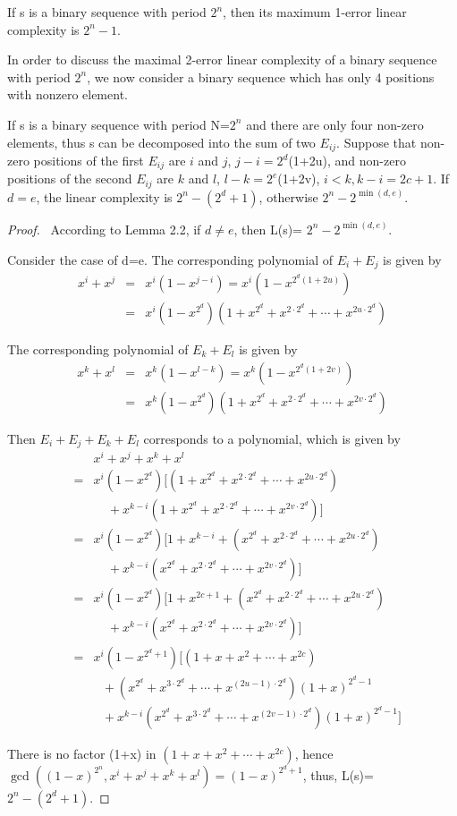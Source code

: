 \documentclass[10pt,conference,twocolumn]{IEEEtran}
\begin{document}
  If s is a binary sequence with period
$2^n$, then its maximum 1-error linear complexity is $2^n-1$.

In order to discuss the maximal 2-error linear complexity of a
binary sequence with period $ 2^n$, we now consider a binary
sequence which has only 4 positions with nonzero element.


 If s is a binary sequence with period
N=$2^n$ and there are only four non-zero elements, thus s can be
decomposed into the sum of two $E_{ij}$. Suppose that non-zero
positions of the first $E_{ij}$ are $i$ and $j$, $j-i=2^d$(1+2u),
and non-zero positions of the second $E_{ij}$ are $k$ and $l$,
$l-k=2^e$(1+2v), $i<k, k-i=2c+1$. If $d=e$, the linear complexity is
$2^n-(2^d+1)$, otherwise $2^n-2^{\min(d,e)}$.

\begin{proof}\
According to Lemma 2.2, if $d\ne e$, then L(s)= $2^n-2^{\min(d,e)}$.

Consider the case of d=e. The corresponding polynomial of $E_i+E_j$
is given by
\begin{eqnarray*}
x^i+x^j&=&x^i(1-x^{j-i})=x^i(1-x^{2^d(1+2u)})\\
&=&x^i(1-x^{2^d})(1+x^{2^d}+x^{2\cdot2^d}+\cdots +x^{2u\cdot2^d})
 \end{eqnarray*}

The corresponding polynomial of $E_k+E_l$ is given by
\begin{eqnarray*}
x^k+x^l&=&x^k(1-x^{l-k})=x^k(1-x^{2^d(1+2v)})\\
&=&x^k(1-x^{2^d})(1+x^{2^d}+x^{2\cdot2^d}+\cdots +x^{2v\cdot2^d})
 \end{eqnarray*}

Then $E_i +E_j+E_k +E_l$ corresponds to a polynomial, which is given
by
\begin{eqnarray*}
&&x^i+x^j+x^k+x^l\\
&=&x^i(1-x^{2^d})[(1+x^{2^d}+x^{2\cdot2^d}+\cdots +x^{2u\cdot2^d})\\
&&\ \ \ \ \ +x^{k-i}(1+x^{2^d}+x^{2\cdot2^d}+\cdots +x^{2v\cdot2^d})]\\
&=&x^i(1-x^{2^d})[1+x^{k-i}+(x^{2^d}+x^{2\cdot2^d}+\cdots +x^{2u\cdot2^d})\\
&&\ \ \ \ \ +x^{k-i}(x^{2^d}+x^{2\cdot2^d}+\cdots +x^{2v\cdot2^d})]\\
&=&x^i(1-x^{2^d})[1+x^{2c+1}+(x^{2^d}+x^{2\cdot2^d}+\cdots +x^{2u\cdot2^d})\\
&&\ \ \ \ \ +x^{k-i}(x^{2^d}+x^{2\cdot2^d}+\cdots +x^{2v\cdot2^d})]\\
&=&x^i(1-x^{2^d+1})[(1+x+x^{2}+\cdots+x^{2c})\\
&&\ \ \  +(x^{2^d}+x^{3\cdot2^d}+\cdots +x^{(2u-1)\cdot2^d})(1+x)^{2^d-1}\\
&&\ \ \  +x^{k-i}(x^{2^d}+x^{3\cdot2^d}+\cdots
+x^{(2v-1)\cdot2^d})(1+x)^{2^d-1}]
 \end{eqnarray*}

There is no factor (1+x) in $(1+x+x^{2}+\cdots+x^{2c})$, hence
$\gcd((1-x)^{2^n},x^i+x^j+x^k+x^l)=(1-x)^{2^d+1}$, thus, L(s)=
$2^n-(2^d+1)$.
\end{proof}\
\end{document}
